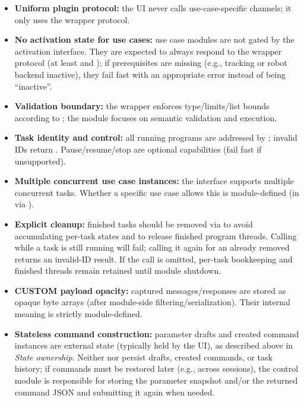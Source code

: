 \begin{itemize}
    \item \textbf{Uniform plugin protocol:} the UI never calls use-case-specific channels; it only uses the wrapper protocol.
    \item \textbf{No activation state for use cases:} use case modules are not gated by the activation interface. They are expected to always respond to the wrapper protocol (at least  and ); if prerequisites are missing (e.g., tracking or robot backend inactive), they fail fast with an appropriate error instead of being ``inactive''.
    \item \textbf{Validation boundary:} the wrapper enforces type/limits/list bounds according to ; the module focuses on semantic validation and execution.
    \item \textbf{Task identity and control:} all running programs are addressed by ; invalid IDs return . Pause/resume/stop are optional capabilities (fail fast if unsupported).
    \item \textbf{Multiple concurrent use case instances:} the interface supports multiple concurrent tasks. Whether a specific use case allows this is module-defined (in  via ).
    \item \textbf{Explicit cleanup:} finished tasks should be removed via  to avoid accumulating per-task states and to release finished program threads. Calling  while a task is still running will fail; calling it again for an already removed  returns an invalid-ID result. If the call is omitted, per-task bookkeeping and finished threads remain retained until module shutdown.
    \item \textbf{CUSTOM payload opacity:} captured messages/responses are stored as opaque byte arrays (after module-side filtering/serialization). Their internal meaning is strictly module-defined.
    \item \textbf{Stateless command construction:} parameter drafts and created command instances are external state (typically held by the UI), as described above in \emph{State ownership}. Neither  nor  persist drafts, created commands, or task history; if commands must be restored later (e.g., across sessions), the control module is responsible for storing the parameter snapshot and/or the returned command JSON and submitting it again when needed.
\end{itemize}






